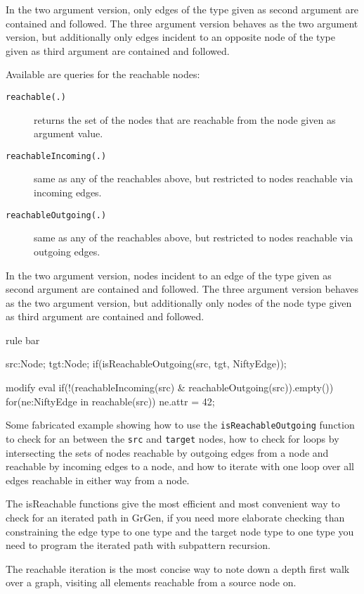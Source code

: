 In the two argument version, only edges of the type given as second argument are contained and followed.
The three argument version behaves as the two argument version, but additionally only edges incident to an opposite node of the type given as third argument are contained and followed.

Available are queries for the reachable nodes:

\begin{description}
\item[\texttt{reachable(.)}] returns the set of the nodes that are reachable from the node given as argument value.
\item[\texttt{reachableIncoming(.)}] same as any of the reachables above, but restricted to nodes reachable via incoming edges.
\item[\texttt{reachableOutgoing(.)}] same as any of the reachables above, but restricted to nodes reachable via outgoing edges.
\end{description}

In the two argument version, nodes incident to an edge of the type given as second argument are contained and followed.
The three argument version behaves as the two argument version, but additionally only nodes of the node type given as third argument are contained and followed.

\begin{example}
\begin{grgen}
rule bar {
    src:Node; 
    tgt:Node;
    if(isReachableOutgoing(src, tgt, NiftyEdge));
    
    modify {
        eval {
            if(!(reachableIncoming(src) & reachableOutgoing(src)).empty())
            {
                for(ne:NiftyEdge in reachable(src))
                {
                    ne.attr = 42;
                }
            }
        }
    }
}
\end{grgen}
Some fabricated example showing how to use the \texttt{isReachableOutgoing} function to check for an  between the \texttt{src} and \texttt{target} nodes, how to check for loops by intersecting the sets of nodes reachable by outgoing edges from a node and reachable by incoming edges to a node, and how to iterate with one loop over all edges reachable in either way from a node.

The isReachable functions give the most efficient and most convenient way to check for an iterated path in GrGen, if you need more elaborate checking than constraining the edge type to one type and the target node type to one type you need to program the iterated path with subpattern recursion.

The reachable iteration is the most concise way to note down a depth first walk over a graph, visiting all elements reachable from a source node on.
\end{example}

